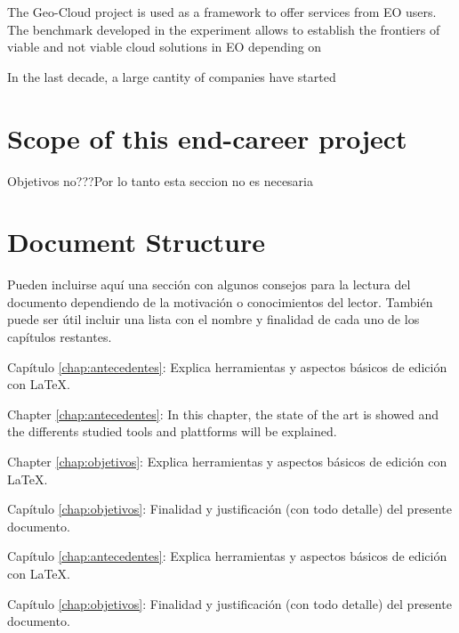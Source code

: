 The Geo-Cloud project is used as a framework to offer services from EO
users. The benchmark developed in the experiment allows to establish the
frontiers of viable and not viable cloud solutions in EO depending on

In the last decade, a large cantity of companies have started


\section{Scope of this end-career project}
Objetivos no???Por lo tanto esta seccion no es necesaria



\section{Document Structure}

Pueden incluirse aquí una sección con algunos consejos para la lectura del
documento dependiendo de la motivación o conocimientos del lector.  También
puede ser útil incluir una lista con el nombre y finalidad de cada uno de los
capítulos restantes.


\begin{definitionlist}
\item[Capítulo \ref{chap:antecedentes}: \nameref{chap:antecedentes}] Explica herramientas
  y aspectos básicos de edición con \LaTeX.
\item[Chapter \ref{chap:antecedentes}: \nameref{chap:objetivos}] In this
  chapter, the state of the art is showed and the differents studied tools and
  plattforms will be explained.
\item[Chapter \ref{chap:objetivos}: \nameref{chap:antecedentes}] Explica herramientas
  y aspectos básicos de edición con \LaTeX.
\item[Capítulo \ref{chap:objetivos}: \nameref{chap:objetivos}] Finalidad y justificación
  (con todo detalle) del presente documento.
\item[Capítulo \ref{chap:antecedentes}: \nameref{chap:antecedentes}] Explica herramientas
  y aspectos básicos de edición con \LaTeX.
\item[Capítulo \ref{chap:objetivos}: \nameref{chap:objetivos}] Finalidad y justificación
  (con todo detalle) del presente documento.
\end{definitionlist}
